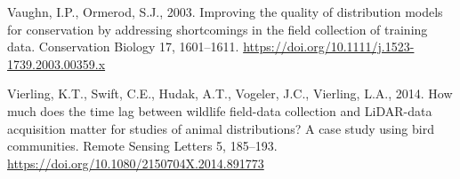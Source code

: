 \documentclass[
]{article}
\newlength{\cslhangindent}
\newlength{\cslentryspacingunit} %
\newenvironment{CSLReferences}[2] %
 {%
  \setlength{\parindent}{0pt}
  \ifodd #1
  \let\oldpar\par
  \def\par{\hangindent=\cslhangindent\oldpar}
  \fi
  \setlength{\parskip}{#2\cslentryspacingunit}
 }%
 {}
\begin{document}
\begin{CSLReferences}{1}{0}
\leavevmode{}%
Vaughn, I.P., Ormerod, S.J., 2003. Improving the quality of distribution models for conservation by addressing shortcomings in the field collection of training data. Conservation Biology 17, 1601--1611. \url{https://doi.org/10.1111/j.1523-1739.2003.00359.x}

\leavevmode{}%
Vierling, K.T., Swift, C.E., Hudak, A.T., Vogeler, J.C., Vierling, L.A., 2014. How much does the time lag between wildlife field-data collection and {LiDAR}-data acquisition matter for studies of animal distributions? {A} case study using bird communities. Remote Sensing Letters 5, 185--193. \url{https://doi.org/10.1080/2150704X.2014.891773}

\end{CSLReferences}

\pagebreak
\end{document}

